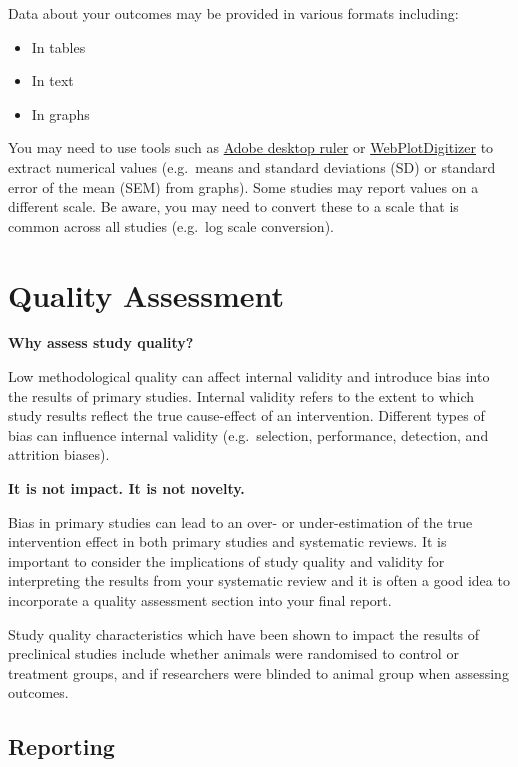 \documentclass[
]{book}
\begin{document}
Data about your outcomes may be provided in various formats including:

\begin{itemize}
\item
  In tables
\item
  In text
\item
  In graphs
\end{itemize}

You may need to use tools such as \href{https://helpx.adobe.com/acrobat/using/grids-guides-measurements-pdfs.html}{Adobe desktop ruler} or \href{https://automeris.io/WebPlotDigitizer/}{WebPlotDigitizer} to extract numerical values (e.g.~means and standard deviations (SD) or standard error of the mean (SEM) from graphs). Some studies may report values on a different scale. Be aware, you may need to convert these to a scale that is common across all studies (e.g.~log scale conversion).

\hypertarget{quality-assessment}{%
\chapter{Quality Assessment}\label{quality-assessment}}

\textbf{Why assess study quality?}

Low methodological quality can affect internal validity and introduce bias into the results of primary studies. Internal validity refers to the extent to which study results reflect the true cause-effect of an intervention. Different types of bias can influence internal validity (e.g.~selection, performance, detection, and attrition biases).

\textbf{It is not impact. It is not novelty.}

Bias in primary studies can lead to an over- or under-estimation of the true intervention effect in both primary studies and systematic reviews. It is important to consider the implications of study quality and validity for interpreting the results from your systematic review and it is often a good idea to incorporate a quality assessment section into your final report.

Study quality characteristics which have been shown to impact the results of preclinical studies include whether animals were randomised to control or treatment groups, and if researchers were blinded to animal group when assessing outcomes.

\hypertarget{reporting}{%
\section{Reporting}\label{reporting}}
\end{document}

